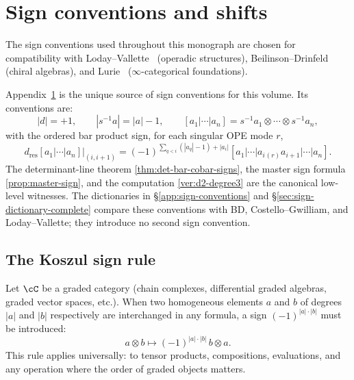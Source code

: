 \chapter{Sign conventions and shifts}
\label{app:signs}


The sign conventions used throughout this monograph are chosen for compatibility with
Loday--Vallette~\cite{LV12} (operadic structures),
Beilinson--Drinfeld~\cite{BD04} (chiral algebras), and Lurie~\cite{HA}
($\infty$-categorical foundations).

\begin{convention}
\label{conv:canonical-sign-source-app-b}
Appendix~\ref{app:signs} is the unique source of sign conventions for
this volume. Its conventions are:
\[
|d|=+1,\qquad |s^{-1}a|=|a|-1,\qquad
[a_1|\cdots|a_n]=s^{-1}a_1\otimes\cdots\otimes s^{-1}a_n,
\]
with the ordered bar product sign, for each singular OPE mode \(r\),
\[
d_{\mathrm{res}}[a_1|\cdots|a_n]\big|_{(i,i+1)}
=
(-1)^{\sum_{q<i}(|a_q|-1)+|a_i|}
[a_1|\cdots|a_i{}_{(r)}a_{i+1}|\cdots|a_n].
\]
The determinant-line theorem
\ref{thm:det-bar-cobar-signs}, the master sign formula
\ref{prop:master-sign}, and the computation
\ref{ver:d2-degree3} are the canonical low-level witnesses. The
dictionaries in \S\ref{app:sign-conventions} and
\S\ref{sec:sign-dictionary-complete} compare these conventions with
BD, Costello--Gwilliam, and Loday--Vallette; they introduce no second
sign convention.
\end{convention}

\section{The Koszul sign rule}
\label{sec:koszul-sign-rule}

\begin{convention}
\label{conv:koszul}
Let $\cC$ be a graded category (chain complexes, differential graded algebras,
graded vector spaces, etc.). When two homogeneous elements $a$ and $b$ of
degrees $|a|$ and $|b|$ respectively are interchanged in any formula, a sign
$(-1)^{|a| \cdot |b|}$ must be introduced:
\[
a \otimes b \longmapsto (-1)^{|a| \cdot |b|} \, b \otimes a.
\]
This rule applies universally: to tensor products, compositions, evaluations,
and any operation where the order of graded objects matters.
\end{convention}

